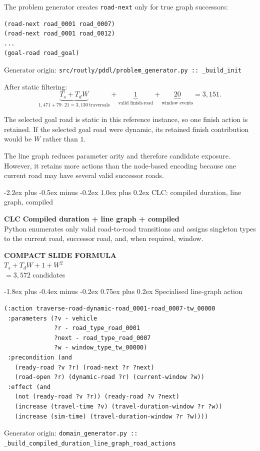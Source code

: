 \documentclass[11pt,a4paper]{article}
\makeatletter
\renewcommand{\section}{\@startsection{section}{1}{0pt}
  {-2.2ex plus -0.5ex minus -0.2ex}
  {1.0ex plus 0.2ex}
  {\normalfont\Large\bfseries\color{RoutlyNavy}}}
\renewcommand{\subsection}{\@startsection{subsection}{2}{0pt}
  {-1.8ex plus -0.4ex minus -0.2ex}
  {0.75ex plus 0.2ex}
  {\normalfont\large\bfseries\color{RoutlyNavy}}}
\newcommand{\configbanner}[4]{%
  \begin{tcolorbox}[
    enhanced,
    colback=#1!8,
    colframe=#1,
    boxrule=0.9pt,
    arc=2mm,
    left=3mm,right=3mm,top=2.5mm,bottom=2.5mm]
    {\LARGE\bfseries\textcolor{#1}{#2}}\hfill
    {\large\bfseries\textcolor{RoutlyNavy}{#3}}\\[1mm]
    {\small\textcolor{RoutlyInk}{#4}}
  \end{tcolorbox}
}
\newcommand{\formularesult}[3]{%
  \begin{tcolorbox}[
    enhanced,
    colback=#1!5,
    colframe=#1!80,
    boxrule=0.8pt,
    arc=2mm,
    left=2.5mm,right=2.5mm,top=2mm,bottom=2mm]
    \centering
    {\small\bfseries\textcolor{RoutlyMuted}{COMPACT SLIDE FORMULA}}\\[1mm]
    {\Large\bfseries\boldmath \(#2\)}\\[1mm]
    {\normalsize #3}
  \end{tcolorbox}
}
\newcommand{\codeorigin}[1]{%
  {\footnotesize\textcolor{RoutlyMuted}{Generator origin: \texttt{#1}}\par}
}
\makeatother
\begin{document}
The problem generator creates \texttt{road-next} only for true graph
successors:
\begin{lstlisting}
(road-next road_0001 road_0007)
(road-next road_0001 road_0012)
...
(goal-road road_goal)
\end{lstlisting}
\codeorigin{src/routly/pddl/problem\_generator.py :: \_build\_init}

After static filtering:
\[
\underbrace{T_s+T_dW}_{1{,}471+79\cdot21=3{,}130\ \text{traversals}}
+
\underbrace{1}_{\text{valid finish-road}}
+
\underbrace{20}_{\text{window events}}
=\boxed{3{,}151}.
\]

The selected goal road is static in this reference instance, so one finish
action is retained. If the selected goal road were dynamic, its retained
finish contribution would be \(W\) rather than \(1\).

\begin{defencebox}
The line graph reduces parameter arity and therefore candidate exposure.
However, it retains more actions than the node-based encoding because one
current road may have several valid successor roads.
\end{defencebox}

\section{CLC: compiled duration, line graph, compiled}

\configbanner{CLCColor}{CLC}{Compiled duration + line graph + compiled}{
Python enumerates only valid road-to-road transitions and assigns singleton
types to the current road, successor road, and, when required, window.}

\formularesult{CLCColor}
  {T_s+T_dW+1+W^2}
  {\(=3{,}572\) candidates}

\subsection{Specialised line-graph action}

\begin{lstlisting}
(:action traverse-road-dynamic-road_0001-road_0007-tw_00000
 :parameters (?v - vehicle
              ?r - road_type_road_0001
              ?next - road_type_road_0007
              ?w - window_type_tw_00000)
 :precondition (and
   (ready-road ?v ?r) (road-next ?r ?next)
   (road-open ?r) (dynamic-road ?r) (current-window ?w))
 :effect (and
   (not (ready-road ?v ?r)) (ready-road ?v ?next)
   (increase (travel-time ?v) (travel-duration-window ?r ?w))
   (increase (sim-time) (travel-duration-window ?r ?w))))
\end{lstlisting}
\codeorigin{domain\_generator.py ::\\
\_build\_compiled\_duration\_line\_graph\_road\_actions}
\end{document}
